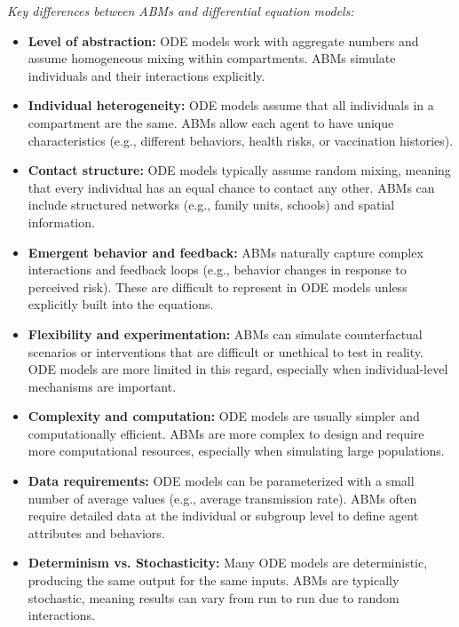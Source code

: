 \documentclass{article}
\begin{document}
\emph{Key differences between ABMs and differential equation models:}
\begin{itemize}
    \item \textbf{Level of abstraction:} ODE models work with aggregate numbers and assume homogeneous mixing within compartments. ABMs simulate individuals and their interactions explicitly.
    
    \item \textbf{Individual heterogeneity:} ODE models assume that all individuals in a compartment are the same. ABMs allow each agent to have unique characteristics (e.g., different behaviors, health risks, or vaccination histories).
    
    \item \textbf{Contact structure:} ODE models typically assume random mixing, meaning that every individual has an equal chance to contact any other. ABMs can include structured networks (e.g., family units, schools) and spatial information.
    
    \item \textbf{Emergent behavior and feedback:} ABMs naturally capture complex interactions and feedback loops (e.g., behavior changes in response to perceived risk). These are difficult to represent in ODE models unless explicitly built into the equations.
    
    \item \textbf{Flexibility and experimentation:} ABMs can simulate counterfactual scenarios or interventions that are difficult or unethical to test in reality. ODE models are more limited in this regard, especially when individual-level mechanisms are important.
    
    \item \textbf{Complexity and computation:} ODE models are usually simpler and computationally efficient. ABMs are more complex to design and require more computational resources, especially when simulating large populations.
    
    \item \textbf{Data requirements:} ODE models can be parameterized with a small number of average values (e.g., average transmission rate). ABMs often require detailed data at the individual or subgroup level to define agent attributes and behaviors.
    
    \item \textbf{Determinism vs. Stochasticity:} Many ODE models are deterministic, producing the same output for the same inputs. ABMs are typically stochastic, meaning results can vary from run to run due to random interactions.
\end{itemize}
\end{document}
